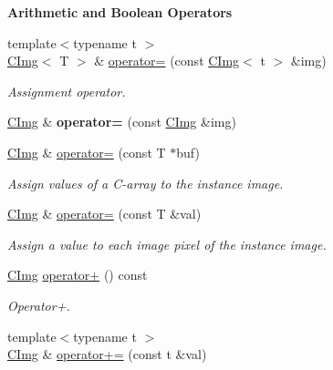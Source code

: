\begin{Indent}{\bf Arithmetic and Boolean Operators}\par
\begin{DoxyCompactItemize}
\item 
{\footnotesize template$<$typename t $>$ }\\\hyperlink{structcimg__library_1_1_c_img}{C\-Img}$<$ T $>$ \& \hyperlink{structcimg__library_1_1_c_img_aa00643fa0ff78f1376773dd18360e872}{operator=} (const \hyperlink{structcimg__library_1_1_c_img}{C\-Img}$<$ t $>$ \&img)
\begin{DoxyCompactList}\small\item\em Assignment operator. \end{DoxyCompactList}\item 
\hypertarget{structcimg__library_1_1_c_img_a4b06be36505657d40277278ba0b53d44}{\hyperlink{structcimg__library_1_1_c_img}{C\-Img} \& {\bfseries operator=} (const \hyperlink{structcimg__library_1_1_c_img}{C\-Img} \&img)}\label{structcimg__library_1_1_c_img_a4b06be36505657d40277278ba0b53d44}

\item 
\hyperlink{structcimg__library_1_1_c_img}{C\-Img} \& \hyperlink{structcimg__library_1_1_c_img_a1408f736e379c076759744a159370ff1}{operator=} (const T $\ast$buf)
\begin{DoxyCompactList}\small\item\em Assign values of a C-\/array to the instance image. \end{DoxyCompactList}\item 
\hypertarget{structcimg__library_1_1_c_img_a1ef1b67d7211dda9186812e3da772cf0}{\hyperlink{structcimg__library_1_1_c_img}{C\-Img} \& \hyperlink{structcimg__library_1_1_c_img_a1ef1b67d7211dda9186812e3da772cf0}{operator=} (const T \&val)}\label{structcimg__library_1_1_c_img_a1ef1b67d7211dda9186812e3da772cf0}

\begin{DoxyCompactList}\small\item\em Assign a value to each image pixel of the instance image. \end{DoxyCompactList}\item 
\hyperlink{structcimg__library_1_1_c_img}{C\-Img} \hyperlink{structcimg__library_1_1_c_img_aa5d24dd9c504c68edc035fded5d0f42d}{operator+} () const 
\begin{DoxyCompactList}\small\item\em Operator+. \end{DoxyCompactList}\item 
\hypertarget{structcimg__library_1_1_c_img_acef63400238602e3cbe7205e3e93b99f}{{\footnotesize template$<$typename t $>$ }\\\hyperlink{structcimg__library_1_1_c_img}{C\-Img} \& \hyperlink{structcimg__library_1_1_c_img_acef63400238602e3cbe7205e3e93b99f}{operator+=} (const t \&val)}\label{structcimg__library_1_1_c_img_acef63400238602e3cbe7205e3e93b99f}


\end{DoxyCompactItemize}
\end{Indent}
